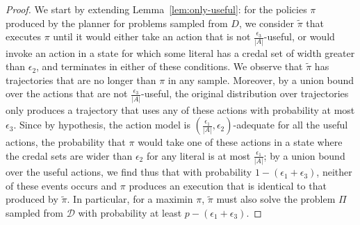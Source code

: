 \documentclass[letterpaper]{article} %
\begin{document}
\begin{proof}
We start by extending Lemma~\ref{lem:only-useful}: for the policies $\pi$ produced by the planner for problems sampled from $D$, we consider $\tilde{\pi}$ that executes $\pi$ until it would either take an action that is not $\frac{\epsilon_3}{|A|}$-useful, or would invoke an action in a state for which some literal has a credal set of width greater than $\epsilon_2$, and terminates in either of these conditions. We observe that $\tilde{\pi}$ has trajectories that
are no longer than $\pi$ in any sample. Moreover, by a union bound over the actions that are not $\frac{\epsilon_3}{|A|}$-useful, the original distribution over trajectories only produces a trajectory that uses any of these actions with probability at most $\epsilon_3$. Since by hypothesis, the action model is $(\frac{\epsilon_1}{|A|},\epsilon_2)$-adequate for all the useful actions, the probability that $\pi$ would take one of these actions in a state where the credal sets are wider than $\epsilon_2$ for any literal is at most $\frac{\epsilon_1}{|A|}$; by a union bound over the useful actions, we find thus that with probability $1-(\epsilon_1+\epsilon_3)$, neither of these events occurs and $\pi$ produces an execution that is identical to that produced by $\tilde{\pi}$. In particular, for a maximin $\pi$, $\tilde{\pi}$ must also solve the problem $\Pi$ sampled from $\mathcal{D}$ with probability at least $p-(\epsilon_1+\epsilon_3)$.


\end{proof}
\end{document}
